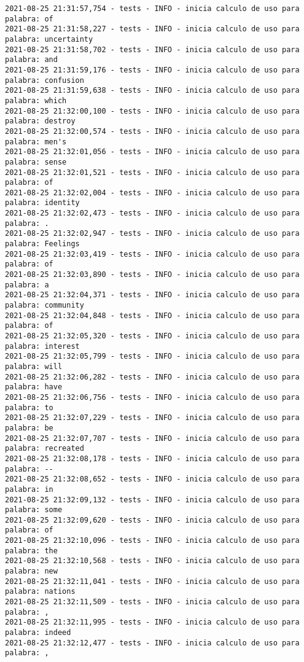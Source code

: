 \documentclass[11pt]{article}
\begin{document}
\begin{verbatim}
2021-08-25 21:31:57,754 - tests - INFO - inicia calculo de uso para palabra: of
2021-08-25 21:31:58,227 - tests - INFO - inicia calculo de uso para palabra: uncertainty
2021-08-25 21:31:58,702 - tests - INFO - inicia calculo de uso para palabra: and
2021-08-25 21:31:59,176 - tests - INFO - inicia calculo de uso para palabra: confusion
2021-08-25 21:31:59,638 - tests - INFO - inicia calculo de uso para palabra: which
2021-08-25 21:32:00,100 - tests - INFO - inicia calculo de uso para palabra: destroy
2021-08-25 21:32:00,574 - tests - INFO - inicia calculo de uso para palabra: men's
2021-08-25 21:32:01,056 - tests - INFO - inicia calculo de uso para palabra: sense
2021-08-25 21:32:01,521 - tests - INFO - inicia calculo de uso para palabra: of
2021-08-25 21:32:02,004 - tests - INFO - inicia calculo de uso para palabra: identity
2021-08-25 21:32:02,473 - tests - INFO - inicia calculo de uso para palabra: .
2021-08-25 21:32:02,947 - tests - INFO - inicia calculo de uso para palabra: Feelings
2021-08-25 21:32:03,419 - tests - INFO - inicia calculo de uso para palabra: of
2021-08-25 21:32:03,890 - tests - INFO - inicia calculo de uso para palabra: a
2021-08-25 21:32:04,371 - tests - INFO - inicia calculo de uso para palabra: community
2021-08-25 21:32:04,848 - tests - INFO - inicia calculo de uso para palabra: of
2021-08-25 21:32:05,320 - tests - INFO - inicia calculo de uso para palabra: interest
2021-08-25 21:32:05,799 - tests - INFO - inicia calculo de uso para palabra: will
2021-08-25 21:32:06,282 - tests - INFO - inicia calculo de uso para palabra: have
2021-08-25 21:32:06,756 - tests - INFO - inicia calculo de uso para palabra: to
2021-08-25 21:32:07,229 - tests - INFO - inicia calculo de uso para palabra: be
2021-08-25 21:32:07,707 - tests - INFO - inicia calculo de uso para palabra: recreated
2021-08-25 21:32:08,178 - tests - INFO - inicia calculo de uso para palabra: --
2021-08-25 21:32:08,652 - tests - INFO - inicia calculo de uso para palabra: in
2021-08-25 21:32:09,132 - tests - INFO - inicia calculo de uso para palabra: some
2021-08-25 21:32:09,620 - tests - INFO - inicia calculo de uso para palabra: of
2021-08-25 21:32:10,096 - tests - INFO - inicia calculo de uso para palabra: the
2021-08-25 21:32:10,568 - tests - INFO - inicia calculo de uso para palabra: new
2021-08-25 21:32:11,041 - tests - INFO - inicia calculo de uso para palabra: nations
2021-08-25 21:32:11,509 - tests - INFO - inicia calculo de uso para palabra: ,
2021-08-25 21:32:11,995 - tests - INFO - inicia calculo de uso para palabra: indeed
2021-08-25 21:32:12,477 - tests - INFO - inicia calculo de uso para palabra: ,

\end{verbatim}
\end{document}
